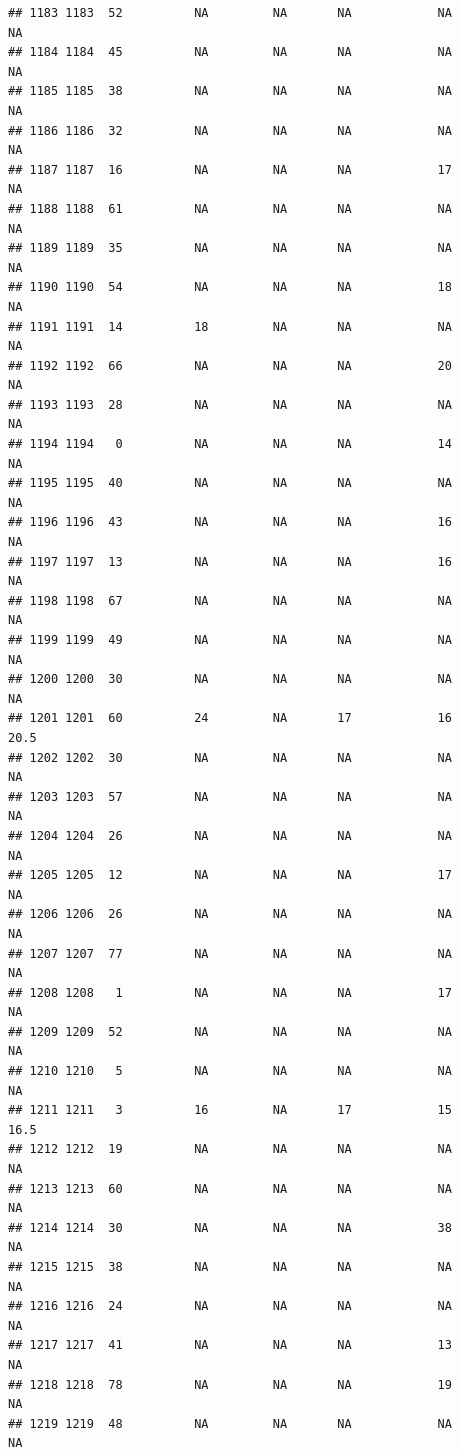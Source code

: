 \documentclass[man]{apa6}
\begin{document}
\begin{verbatim}
## 1183 1183  52          NA         NA       NA            NA       NA
## 1184 1184  45          NA         NA       NA            NA       NA
## 1185 1185  38          NA         NA       NA            NA       NA
## 1186 1186  32          NA         NA       NA            NA       NA
## 1187 1187  16          NA         NA       NA            17       NA
## 1188 1188  61          NA         NA       NA            NA       NA
## 1189 1189  35          NA         NA       NA            NA       NA
## 1190 1190  54          NA         NA       NA            18       NA
## 1191 1191  14          18         NA       NA            NA       NA
## 1192 1192  66          NA         NA       NA            20       NA
## 1193 1193  28          NA         NA       NA            NA       NA
## 1194 1194   0          NA         NA       NA            14       NA
## 1195 1195  40          NA         NA       NA            NA       NA
## 1196 1196  43          NA         NA       NA            16       NA
## 1197 1197  13          NA         NA       NA            16       NA
## 1198 1198  67          NA         NA       NA            NA       NA
## 1199 1199  49          NA         NA       NA            NA       NA
## 1200 1200  30          NA         NA       NA            NA       NA
## 1201 1201  60          24         NA       17            16     20.5
## 1202 1202  30          NA         NA       NA            NA       NA
## 1203 1203  57          NA         NA       NA            NA       NA
## 1204 1204  26          NA         NA       NA            NA       NA
## 1205 1205  12          NA         NA       NA            17       NA
## 1206 1206  26          NA         NA       NA            NA       NA
## 1207 1207  77          NA         NA       NA            NA       NA
## 1208 1208   1          NA         NA       NA            17       NA
## 1209 1209  52          NA         NA       NA            NA       NA
## 1210 1210   5          NA         NA       NA            NA       NA
## 1211 1211   3          16         NA       17            15     16.5
## 1212 1212  19          NA         NA       NA            NA       NA
## 1213 1213  60          NA         NA       NA            NA       NA
## 1214 1214  30          NA         NA       NA            38       NA
## 1215 1215  38          NA         NA       NA            NA       NA
## 1216 1216  24          NA         NA       NA            NA       NA
## 1217 1217  41          NA         NA       NA            13       NA
## 1218 1218  78          NA         NA       NA            19       NA
## 1219 1219  48          NA         NA       NA            NA       NA

\end{verbatim}
\end{document}
